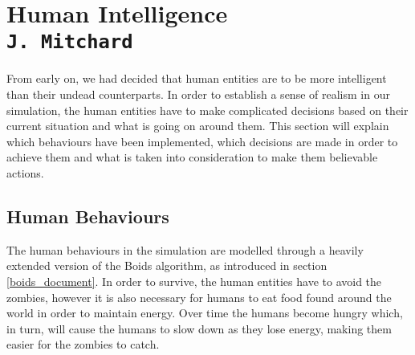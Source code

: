 \pagestyle{empty}



\section{Human Intelligence\\{\small\tt J.~Mitchard}}
\label{human_doc}
From early on, we had decided that human entities are to be more intelligent than their undead counterparts. In order to establish a sense of realism in our simulation, the human entities have to make complicated decisions based on their current situation and what is going on around them. This section will explain which behaviours have been implemented, which decisions are made in order to achieve them and what is taken into consideration to make them believable actions.

\subsection{Human Behaviours}
The human behaviours in the simulation are modelled through a heavily extended version of the Boids algorithm, as introduced in section \ref{boids_document}. In order to survive, the human entities have to avoid the zombies, however it is also necessary for humans to eat food found around the world in order to maintain energy. Over time the humans become hungry which, in turn, will cause the humans to slow down as they lose energy, making them easier for the zombies to catch.

